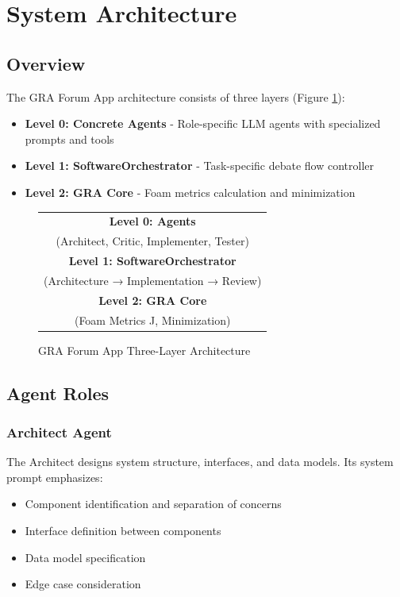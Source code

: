 \documentclass[12pt,a4paper]{article}
\begin{document}
\section{System Architecture}

\subsection{Overview}
The GRA Forum App architecture consists of three layers (Figure \ref{fig:architecture}):

\begin{itemize}
    \item \textbf{Level 0: Concrete Agents} - Role-specific LLM agents with specialized prompts and tools
    \item \textbf{Level 1: SoftwareOrchestrator} - Task-specific debate flow controller
    \item \textbf{Level 2: GRA Core} - Foam metrics calculation and minimization
\end{itemize}

\begin{figure}[htbp]
\centering
\begin{tabular}{|c|}
\hline
\textbf{Level 0: Agents} \\
(Architect, Critic, Implementer, Tester) \\
\hline
\textbf{Level 1: SoftwareOrchestrator} \\
(Architecture → Implementation → Review) \\
\hline
\textbf{Level 2: GRA Core} \\
(Foam Metrics J, Minimization) \\
\hline
\end{tabular}
\caption{GRA Forum App Three-Layer Architecture}
\label{fig:architecture}
\end{figure}

\subsection{Agent Roles}

\subsubsection{Architect Agent}
The Architect designs system structure, interfaces, and data models. Its system prompt emphasizes:
\begin{itemize}
    \item Component identification and separation of concerns
    \item Interface definition between components
    \item Data model specification
    \item Edge case consideration
\end{itemize}
\end{document}
